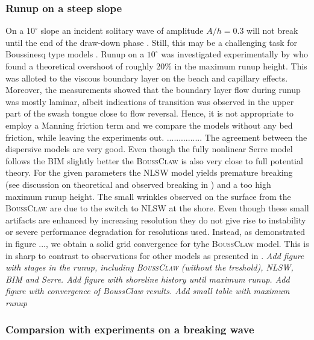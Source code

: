 \documentclass[review]{elsarticle}
\newcommand{\BoussClaw}{\textsc{BoussClaw} }
\begin{document}
\subsubsection{Runup on a steep slope}
\label{sec:10degrunup}
On a $10^\circ$ slope an incident solitary wave of amplitude $A/h=0.3$ will not break until the end of the draw-down phase \cite{Grilli:1997}.
Still, this may be a challenging task for Boussinesq type models \citep{Lovholt:2013a}. Runup on a $10^\circ$ was investigated experimentally
by \citet{Pedersen:2013} who found a theoretical overshoot of roughly 20\% in the maximum runup height. This was alloted to the viscous boundary layer on the beach and capillary effects. Moreover, the measurements showed that the boundary layer flow during runup was mostly laminar, albeit indications of transition was observed in the upper part of the swash tongue close to flow reversal. Hence, it is not appropriate to employ a Manning friction term and we compare the models without any bed friction, while leaving the experiments out. 
...............
The agreement between the dispersive models are very good. Even though the fully nonlinear Serre model follows the BIM slightly better the \BoussClaw is also 
very close to full potential theory. For the given parameters the NLSW model yields premature breaking (see discussion on theoretical and observed breaking in \cite{Pedersen:2013}) and a too high maximum runup height. The small wrinkles observed on the 
surface from the \BoussClaw are due to the
switch to NLSW at the shore. Even though these small artifacts are enhanced by increasing resolution they do not give rise to instability or severe 
performance degradation for resolutions used. Instead, as demonstrated in figure ..., we obtain a solid grid convergence for tyhe \BoussClaw model. This is in 
sharp to contrast to observations for other models as presented in  \cite{Lovholt:2013a}.    
{\em Add figure with stages in the runup, including \BoussClaw (without the treshold), NLSW, BIM and Serre. Add figure with shoreline history until maximum runup. Add figure with convergence of BoussClaw results. Add small table with maximum runup}
 
\subsubsection{Comparsion with experiments on a breaking wave}
\label{sec:wave_break}

\end{document}
